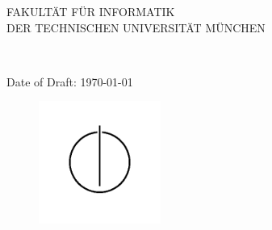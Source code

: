 






\thispagestyle{empty}

\vspace{4cm}
\begin{center}
  \oTUM{4cm}

  \vspace{5mm}
  \huge FAKULT{\"A}T F{\"U}R INFORMATIK\\
  \vspace{0.5cm}
  \large DER TECHNISCHEN UNIVERSIT{\"A}T M{\"U}NCHEN\\
  \vspace{1mm}

\end{center}


\vspace{15mm}
\begin{center}

  {\Large \thedoctype}

  \vspace{20mm}

  {\huge\bf \thetitle}\\%


  \vspace{15mm}


  {\LARGE  \theauthor}


  \ifx\final\undefined
  {\Large Date of Draft: \today}
  \else
  \vspace{5mm}
  \fi


  \begin{figure}[h!]
    \centering
    \includegraphics[width=4cm]{styles/informat.png}
  \end{figure}


\end{center}
